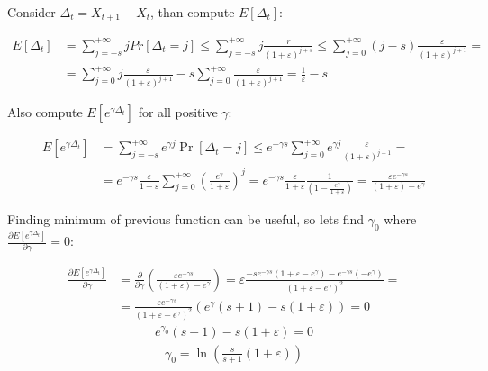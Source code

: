 \documentclass[12pt, a4paper]{article}
\theoremstyle{remark}
\begin{document}
Consider \(\Delta_t = X_{t + 1} - X_{t}\), than compute \(E[\Delta_t]\):

\begin{align*}
    E[\Delta_t] &= \sum_{j = -s}^{+\infty} j Pr[\Delta_t = j] \leq \sum_{j = -s}^{+\infty} j \frac{r}{(1 + \varepsilon)^{j + s}} \leq \sum_{j = 0}^{+\infty} (j - s) \frac{\varepsilon}{(1 + \varepsilon)^{j + 1}} = \\
    &= \sum_{j = 0}^{+\infty} j \frac{\varepsilon}{(1 + \varepsilon)^{j + 1}} - s \sum_{j = 0}^{+\infty}\frac{\varepsilon}{(1 + \varepsilon)^{j + 1}} = \frac{1}{\varepsilon} - s
\end{align*}

Also compute \(E\left[e^{\gamma \Delta_t}\right]\) for all positive \(\gamma\):

\begin{align*}
    E[e^{\gamma \Delta_t}] &= \sum_{j = -s}^{+\infty} e^{\gamma j} \Pr[\Delta_t = j] \leq e^{-\gamma s} \sum_{j = 0}^{+\infty} e^{\gamma j} \frac{\varepsilon}{(1 + \varepsilon)^{j + 1}} = \\
    &= e^{-\gamma s} \frac{\varepsilon}{1 + \varepsilon} \sum_{j = 0}^{+\infty} \left(\frac{e^\gamma}{1 + \varepsilon}\right)^j = e^{-\gamma s} \frac{\varepsilon}{1 + \varepsilon} \frac{1}{(1 - \frac{e^\gamma}{1 + \varepsilon})} = \frac{\varepsilon e^{-\gamma s}}{(1 + \varepsilon) - e^\gamma} 
\end{align*}

Finding minimum of previous function can be useful, so lets find \(\gamma_0\) where \(\frac{\partial E[e^{\gamma \Delta_t}]}{\partial \gamma} = 0\):

\begin{align*}
    \frac{\partial E[e^{\gamma \Delta_t}]}{\partial \gamma} &= \frac{\partial }{\partial \gamma} \left(\frac{\varepsilon e^{-\gamma s}}{(1 + \varepsilon) - e^\gamma}\right) = \varepsilon \frac{-s e^{-\gamma s} (1 + \varepsilon - e^\gamma) - e^{-\gamma s}(-e^\gamma)}{(1 + \varepsilon - e^\gamma)^2} = \\
    &= \frac{-\varepsilon e^{-\gamma s}}{(1 + \varepsilon - e^\gamma)^2} (e^\gamma (s + 1) - s (1 + \varepsilon)) = 0
\end{align*}
\begin{align*}
    e^{\gamma_0} (s + 1) - s (1 + \varepsilon) = 0
\end{align*}
\begin{align*}
    \gamma_0 = \ln\left(\frac{s}{s + 1}(1 + \varepsilon)\right)
\end{align*}
\end{document}
